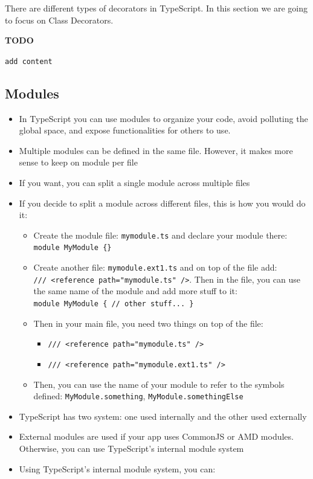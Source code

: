 \documentclass[12pt,]{article}
\providecommand{\tightlist}{%
  \setlength{\itemsep}{0pt}\setlength{\parskip}{0pt}}
\begin{document}
There are different types of decorators in TypeScript. In this section
we are going to focus on Class Decorators.

\textbf{TODO}

\texttt{add\ content}

\subsection{Modules}\label{modules}

\begin{itemize}
\tightlist
\item
  In TypeScript you can use modules to organize your code, avoid
  polluting the global space, and expose functionalities for others to
  use.
\item
  Multiple modules can be defined in the same file. However, it makes
  more sense to keep on module per file
\item
  If you want, you can split a single module across multiple files
\item
  If you decide to split a module across different files, this is how
  you would do it:

  \begin{itemize}
  \tightlist
  \item
    Create the module file: \texttt{mymodule.ts} and declare your module
    there: \texttt{module\ MyModule\ \{\}}
  \item
    Create another file: \texttt{mymodule.ext1.ts} and on top of the
    file add:
    \texttt{///\ \textless{}reference\ path="mymodule.ts"\ /\textgreater{}}.
    Then in the file, you can use the same name of the module and add
    more stuff to it:
    \texttt{module\ MyModule\ \{\ //\ other\ stuff...\ \}}
  \item
    Then in your main file, you need two things on top of the file:

    \begin{itemize}
    \tightlist
    \item
      \texttt{///\ \textless{}reference\ path="mymodule.ts"\ /\textgreater{}}
    \item
      \texttt{///\ \textless{}reference\ path="mymodule.ext1.ts"\ /\textgreater{}}
    \end{itemize}
  \item
    Then, you can use the name of your module to refer to the symbols
    defined: \texttt{MyModule.something},
    \texttt{MyModule.somethingElse}
  \end{itemize}
\item
  TypeScript has two system: one used internally and the other used
  externally
\item
  External modules are used if your app uses CommonJS or AMD modules.
  Otherwise, you can use TypeScript's internal module system
\item
  Using TypeScript's internal module system, you can:


\end{itemize}
\end{document}
